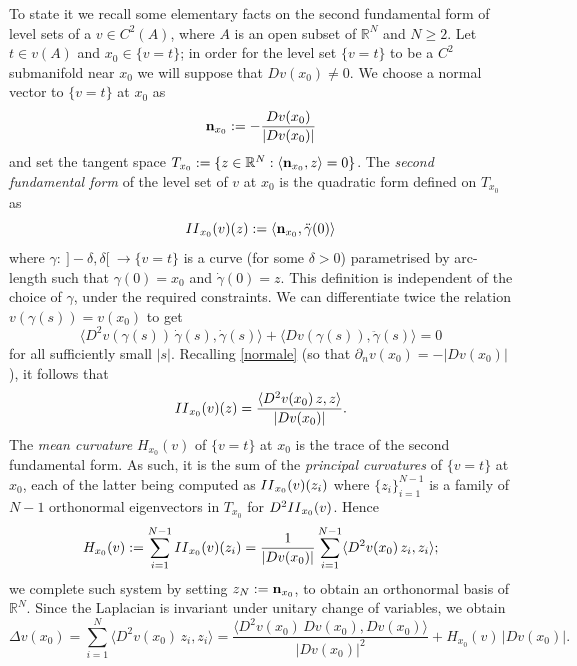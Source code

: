 \documentclass[12pt]{amsart}
\numberwithin{equation}{section}
\theoremstyle{plain}
\theoremstyle{plain}
\theoremstyle{plain}
\theoremstyle{definition}
\newcommand{\R}{{\mathbb R}}
\newcommand{\beq}{\begin{equation}}
\newcommand{\eeq}{\end{equation}}
\renewcommand{\ge}{\geqslant}
\begin{document}
 \smallskip

To state it we recall some elementary facts on the second fundamental form of level sets of a $v\in C^2(A)$, where $A$ is an open subset of $\R^N$ and $N\ge 2$. 
Let $t \in v(A)$ and $x_0 \in \{v=t\}$; in order for the level set $\{v=t\}$ to be a $C^2$ submanifold near $x_0$ we will suppose that $Dv(x_0)\ne 0$. 
We choose a normal vector to $\{v=t\}$ at $x_0$ as
\beq
\label{normale}
 {\bf n}_{x_0} :=-\frac{Dv(x_0)}{|Dv(x_0)|}
 \eeq
 and set the tangent space $T_{x_0}:=\{z\in \R^N:\langle {\bf n}_{x_0}, z\rangle=0\}$. 
The \emph{second fundamental form} of the level set of $v$ at $x_0$ is the quadratic form defined on $T_{x_0}$ as
\[
{\rm II}_{x_0}(v)(z):=\langle {\bf n}_{x_0}, \ddot{\gamma}(0)\rangle
\]
where $\gamma:\ ]-\delta, \delta[\ \to \{v=t\} $ is a curve (for some $\delta>0$) parametrised by arc-length such that $\gamma(0)=x_0$ and $\dot\gamma(0)=z$. 
This definition is independent of the choice of $\gamma$, under the required constraints. 
We can differentiate twice the relation $v(\gamma(s))=v(x_0)$ to get
\[
\langle D^2v(\gamma(s))\,\dot\gamma(s), \dot\gamma(s)\rangle +\langle Dv(\gamma(s)), \ddot{\gamma}(s)\rangle=0
\]
for all sufficiently small $|s|$. 
Recalling \eqref{normale} (so that $\partial_n v(x_0)=-|Dv(x_0)|$), it follows that
\beq
\label{secondff}
{\rm II}_{x_0}(v)(z)=\frac{\langle D^2v(x_0)\,z, z\rangle}{|Dv(x_0)|}.
\eeq
The \emph{mean curvature} $H_{x_0}(v)$ of $\{v=t\}$ at $x_0$ is the trace of the second fundamental form. 
As such, it is the sum of the {\em principal curvatures} of $\{v=t\}$ at $x_0$, each of the latter being computed as ${\rm II}_{x_0}(v)(z_i)$ where $\{z_i\}_{i=1}^{N-1}$ is a family of $N-1$ orthonormal eigenvectors in $T_{x_0}$ for $D^2{\rm II}_{x_0}(v)$. 
Hence 
\[
H_{x_0}(v):=\sum_{i=1}^{N-1} {\rm II}_{x_0}(v)(z_i)=\frac{1}{|Dv(x_0)|}\sum_{i=1}^{N-1}\langle D^2v(x_0)\,z_i, z_i\rangle;
\]
we complete such system by setting $z_N:={\bf n}_{x_0}$, to obtain an orthonormal basis of $\R^N$. 
Since the Laplacian is invariant under unitary change of variables, we obtain
\beq
\label{curvmedlap}
\Delta v(x_0)=\sum_{i=1}^N\langle D^2v(x_0)\,z_i, z_i\rangle=\frac{\langle D^2v(x_0)\,Dv(x_0), Dv(x_0)\rangle}{|Dv(x_0)|^2}+H_{x_0}(v)\, |Dv(x_0)|.
\eeq
\end{document}
